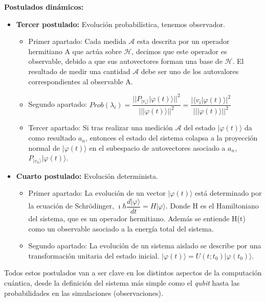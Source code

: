 \textbf{Postulados dinámicos:}
\begin{itemize}
    \item \textbf{Tercer postulado:} Evolución probabilística, tenemos observador.
        \begin{itemize}
            \item Primer apartado: Cada medida $\mathscr{A}$ esta descrita por un operador hermitiano A que actúa sobre $\mathscr{H}$, decimos que este operador es observable, debido a que sus autovectores forman una base de $\mathscr{H}$. El resultado de medir una cantidad $\mathscr{A}$ debe ser uno de los autovalores correspondientes al observable A.
            \vspace{10pt}
            \item Segundo apartado: $Prob(\lambda_{i}) =  \dfrac{|| P_{|v_{i}\rangle} | \varphi (t) \rangle||^{2}}{||| \varphi (t) \rangle||^{2}} = \dfrac{| \langle  v_{i}  |  \varphi (t)  \rangle |^{2}}{||| \varphi (t) \rangle||^{2}}$
            \vspace{10pt}
            \item Tercer apartado: Si tras realizar una medición $\mathscr{A}$ del estado $|\varphi(t) \rangle$ da como resultado $a_{n}$, entonces el estado del sistema colapsa a la proyección normal de $|\varphi(t) \rangle$ en el subespacio de autovectores asociado a $a_{n}$,  $P_{|v_{n} \rangle} | \varphi (t) \rangle$.
        \end{itemize}
        
        \vspace{5pt}
    \item \textbf{Cuarto postulado:} Evolución determinista.
        \begin{itemize}
            \item Primer apartado: La evolución de un vector $| \varphi (t) \rangle$ está determinado por la ecuación de Schrödinger, $\imath \hbar \dfrac{d|\varphi\rangle}{dt}=H |\varphi\rangle$. Donde H es el Hamiltoniano del sistema, que es un operador hermitiano. Además se entiende H(t) como un observable asociado a la energía total del sistema.
            \item Segundo apartado: La evolución de un sistema aislado se describe por una transformación unitaria del estado inicial. $| \varphi (t) \rangle = U(t;t_{0})  | \varphi (t_{0}) \rangle$.
        \end{itemize}
\end{itemize}

Todos estos postulados van a ser clave en los distintos aspectos de la computación cuántica, desde la definición del sistema más simple como el \textit{qubit} hasta las probabilidades en las simulaciones (observaciones).


